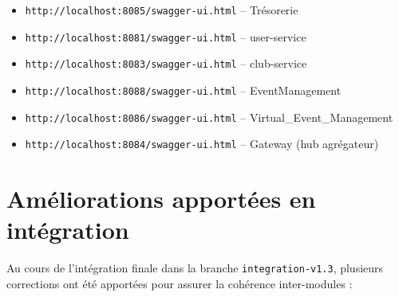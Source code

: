 \documentclass[11pt,a4paper]{article}
\begin{document}
\begin{itemize}[leftmargin=*]
  \item \texttt{http://localhost:8085/swagger-ui.html} -- Trésorerie
  \item \texttt{http://localhost:8081/swagger-ui.html} -- user-service
  \item \texttt{http://localhost:8083/swagger-ui.html} -- club-service
  \item \texttt{http://localhost:8088/swagger-ui.html} -- EventManagement
  \item \texttt{http://localhost:8086/swagger-ui.html} -- Virtual\_Event\_Management
  \item \texttt{http://localhost:8084/swagger-ui.html} -- Gateway (hub agrégateur)
\end{itemize}

\section{Améliorations apportées en intégration}

Au cours de l'intégration finale dans la branche \texttt{integration-v1.3}, plusieurs corrections ont été apportées pour assurer la cohérence inter-modules :
\end{document}
